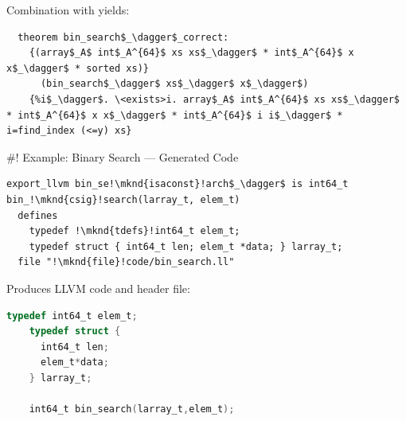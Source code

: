 \documentclass[fleqn]{beamer}
\begin{document}
  Combination with  yields:
  \begin{lstlisting}
  theorem bin_search$_\dagger$_correct:
    {(array$_A$ int$_A^{64}$ xs xs$_\dagger$ * int$_A^{64}$ x x$_\dagger$ * sorted xs)}
      (bin_search$_\dagger$ xs$_\dagger$ x$_\dagger$)
    {%i$_\dagger$. \<exists>i. array$_A$ int$_A^{64}$ xs xs$_\dagger$ * int$_A^{64}$ x x$_\dagger$ * int$_A^{64}$ i i$_\dagger$ * i=find_index (<=y) xs}
  \end{lstlisting}


#! Example: Binary Search --- Generated Code
  \newcommand{\mknd}[1]{\makebox[0pt]{\tikz[remember picture]{\node (#1) {};}}}

  \begin{lstlisting}[escapechar=!]
  export_llvm bin_se!\mknd{isaconst}!arch$_\dagger$ is int64_t bin_!\mknd{csig}!search(larray_t, elem_t)
  defines
    typedef !\mknd{tdefs}!int64_t elem_t;
    typedef struct { int64_t len; elem_t *data; } larray_t;
  file "!\mknd{file}!code/bin_search.ll"
  \end{lstlisting}




  Produces LLVM code and header file:
  \begin{lstlisting}[language=C]
    typedef int64_t elem_t;
    typedef struct {
      int64_t len;
      elem_t*data;
    } larray_t;

    int64_t bin_search(larray_t,elem_t);
  \end{lstlisting}
\end{document}

